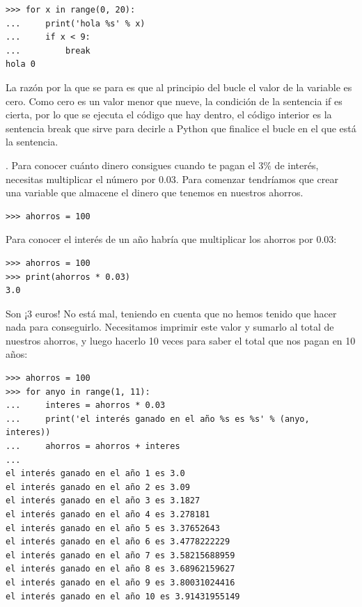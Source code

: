 \begin{listing}
\begin{verbatim}
>>> for x in range(0, 20):
...     print('hola %s' % x)
...     if x < 9:
...         break
hola 0
\end{verbatim}
\end{listing}

\noindent
La razón por la que se para es que al principio del bucle el valor de la variable  es cero.   Como cero es un valor menor que nueve, la condición de la sentencia if es cierta, por lo que se ejecuta el código que hay dentro, el código interior es la sentencia break que sirve para decirle a Python que finalice el bucle en el que está la sentencia.

. Para conocer cuánto dinero consigues cuando te pagan el 3\% de interés, necesitas multiplicar el número por 0.03.   Para comenzar tendríamos que crear una variable que almacene el dinero que tenemos en nuestros ahorros.

\begin{listing}
\begin{verbatim}
>>> ahorros = 100
\end{verbatim}
\end{listing}

Para conocer el interés de un año habría que multiplicar los ahorros por 0.03:

\begin{listing}
\begin{verbatim}
>>> ahorros = 100
>>> print(ahorros * 0.03)
3.0
\end{verbatim}
\end{listing}

Son ¡3 euros!    No está mal, teniendo en cuenta que no hemos tenido que hacer nada para conseguirlo.   Necesitamos imprimir este valor y sumarlo al total de nuestros ahorros, y luego hacerlo 10 veces para saber el total que nos pagan en 10 años:

\begin{listing}
\begin{verbatim}
>>> ahorros = 100
>>> for anyo in range(1, 11):
...     interes = ahorros * 0.03
...     print('el interés ganado en el año %s es %s' % (anyo, interes))
...     ahorros = ahorros + interes
... 
el interés ganado en el año 1 es 3.0
el interés ganado en el año 2 es 3.09
el interés ganado en el año 3 es 3.1827
el interés ganado en el año 4 es 3.278181
el interés ganado en el año 5 es 3.37652643
el interés ganado en el año 6 es 3.4778222229
el interés ganado en el año 7 es 3.58215688959
el interés ganado en el año 8 es 3.68962159627
el interés ganado en el año 9 es 3.80031024416
el interés ganado en el año 10 es 3.91431955149
\end{verbatim}
\end{listing}

